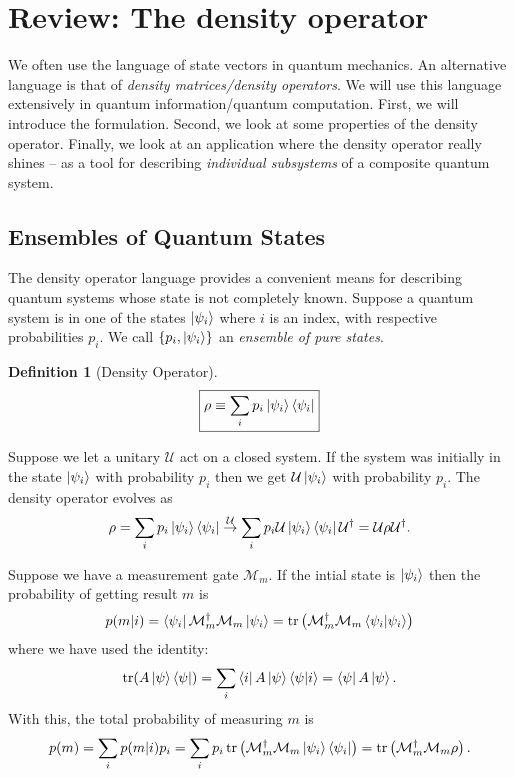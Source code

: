 \documentclass{book}
\theoremstyle{definition}
\newtheorem{defn}{Definition}[section]
\newcommand{\M}{\mathcal{M}}
\newcommand{\lp}{\left(}
\newcommand{\rp}{\right)}
\newcommand{\U}{\mathcal{U}}
\begin{document}
\newpage


\section{Review: The density operator}        

  
We often use the language of state vectors in quantum mechanics. An alternative language is that of \textit{density matrices/density operators}. We will use this language extensively in quantum information/quantum computation. First, we will introduce the formulation. Second, we look at some properties of the density operator. Finally, we look at an application where the density operator really shines -- as a tool for describing \textit{individual subsystems} of a composite quantum system.  


\subsection{Ensembles of Quantum States}

The density operator language provides a convenient means for describing quantum systems whose state is not completely known. Suppose a quantum system is in one of the states $\ket{\psi_i}$ where $i$ is an index, with respective probabilities $p_i$. We call $\{p_i, \ket{\psi_i}\}$ an \textit{ensemble of pure states}. \\

\begin{defn}[Density Operator]
	\begin{align}
	\boxed{\rho \equiv \sum_i p_i \ket{\psi_i}\bra{\psi_i}}
	\end{align}
\end{defn}



Suppose we let a unitary $\U$ act on a closed system. If the system was initially in the state $\ket{\psi_i}$ with probability $p_i$ then we get $\U \ket{\psi_i}$ with probability $p_i$. The density operator evolves as
\begin{align}
\rho = \sum_i p_i \ket{\psi_i}\bra{\psi_i} \stackrel{\U}{\rightarrow} \sum_i p_i \U \ket{\psi_i}\bra{\psi_i}\U^\dagger = \U \rho \U^\dagger.
\end{align}


Suppose we have a measurement gate $\M_m$. If the intial state is $\ket{\psi_i}$ then the probability of getting result $m$ is 
\begin{align}
p(m\vert i) = \bra{\psi_i} \M_m^\dagger \M_m \ket{\psi_i} = \tr\lp \M_m^\dagger \M_m \braket{\psi_i} \rp
\end{align}
where we have used the identity:
\begin{align}
\tr(A\ket{\psi}\bra{\psi}) = \sum_i \bra{i}A \ket{\psi}\bra{\psi}\ket{i} = \bra{\psi}A\ket{\psi}.
\end{align}
With this, the total probability of measuring $m$ is 
\begin{align}
p(m) = \sum_i p(m|i)p_i = \sum_i p_i \tr\lp \M_m^\dagger \M_m \ket{\psi_i}\bra{\psi_i} \rp = \tr\lp \M_m^\dagger \M_m \rho \rp.
\end{align}
\end{document}
